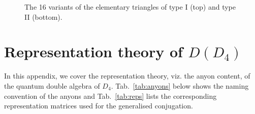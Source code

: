 \documentclass[a4paper,twocolumn,11pt, accepted=2024-06-14]{quantumarticle}
\begin{document}
\begin{figure}
\begin{tabular}{llll}
\end{tabular}\vspace{20pt}
\caption{The 16 variants of the elementary triangles of type I (top) and type II (bottom).}
\label{fig:al_trigs}
\end{figure}



\section{Representation theory of $D(D_4)$}\label{app:reps}

In this appendix, we cover the representation theory, viz. the anyon content, of the quantum double algebra of $D_4$. Tab.~\ref{tab:anyons} below shows the naming convention of the anyons and Tab.~\ref{tab:reps} lists the corresponding representation matrices used for the generalised conjugation.
\end{document}
